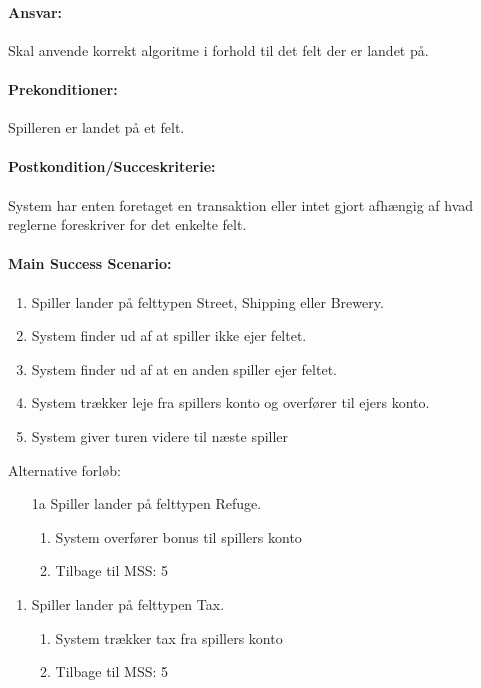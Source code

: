 \paragraph{Ansvar:} 
Skal anvende korrekt algoritme i forhold til det felt der er landet på.
 
\paragraph{Prekonditioner:} 
Spilleren er landet på et felt.

\paragraph{Postkondition/Succeskriterie:}
System har enten foretaget en transaktion eller intet gjort afhængig af hvad reglerne foreskriver for det enkelte felt.

\paragraph{Main Success Scenario:} 

\begin{enumerate}
\item Spiller lander på felttypen Street, Shipping eller Brewery.
\item System finder ud af at spiller ikke ejer feltet.
\item System finder ud af at en anden spiller ejer feltet.
\item System trækker leje fra spillers konto og overfører til ejers konto.
\item System giver turen videre til næste spiller
\end{enumerate}
Alternative forløb:
\begin{enumerate}[1a]
\item[1a] Spiller lander på felttypen Refuge.
	\begin{enumerate}[1.]
	\item System overfører bonus til spillers konto
	\item Tilbage til MSS: 5
	\end{enumerate}
\end{enumerate} 

\begin{enumerate}[1b]
\item Spiller lander på felttypen Tax.
	\begin{enumerate}[1.]
	\item System trækker tax fra spillers konto 
	\item Tilbage til MSS: 5
	\end{enumerate}
\end{enumerate} 

